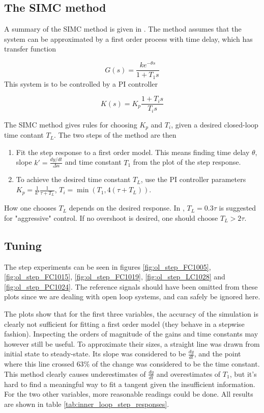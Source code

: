 \documentclass[12pt]{article}
\begin{document}
\subsection{The SIMC method}
A summary of the SIMC method is given in \cite{regtek}. The method assumes that the system can be approximated by a first order process with time delay, which has transfer function

\begin{equation}
G(s) = \frac{k e^{-\theta s}}{1 + T_1 s}
\end{equation}
This system is to be controlled by a PI controller

\begin{equation}
K(s) = K_p\frac{1 + T_i s}{T_i s}
\end{equation}

The SIMC method gives rules for choosing $K_p$ and $T_i$, given a desired closed-loop time contant $T_L$. The two steps of the method are then

\begin{enumerate}
\item Fit the step response to a first order model. This means finding time delay $\theta$, slope $k' = \frac{dy/dt}{\Delta u}$ and time constant $T_1$ from the plot of the step response.
\item To achieve the desired time constant $T_L$, use the PI controller parameters $K_p = \frac{1}{k'} \frac{1}{\tau + T_L}$, $T_i = \min(T_1, 4(\tau + T_L))$.
\end{enumerate}
How one chooses $T_L$ depends on the desired response. In \cite{regtek}, $T_L = 0.3\tau$ is suggested for "aggressive" control. If no overshoot is desired, one should choose $T_L > 2 \tau$.

\subsection{Tuning}
The step experiments can be seen in figures \ref{fig:ol_step_FC1005}, \ref{fig:ol_step_FC1015}, \ref{fig:ol_step_FC1019}, \ref{fig:ol_step_LC1028} and \ref{fig:ol_step_PC1024}. The reference signals should have been omitted from these plots since we are dealing with open loop systems, and can safely be ignored here.

The plots show that for the first three variables, the accuracy of the simulation is clearly not sufficient for fitting a first order model (they behave in a stepwise fashion). Inspecting the orders of magnitude of the gains and time constants may however still be useful. To approximate their sizes, a straight line was drawn from initial state to steady-state. Its slope was considered to be $\frac{dy}{dt}$, and the point where this line crossed $63\%$ of the change was considered to be the time constant. This method clearly causes underestimates of $\frac{dy}{dt}$ and overestimates of $T_1$, but it's hard to find a meaningful way to fit a tangent given the insufficient information. For the two other variables, more reasonable readings could be done. All results are shown in table \ref{tab:inner_loop_step_responses}.
\end{document}
